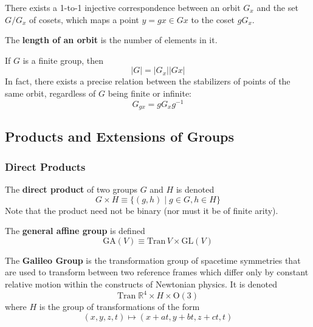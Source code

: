   \begin{theorem}
    There exists a 1-to-1 injective correspondence between an orbit $G_x$ and the set $G / G_{x}$ of cosets, which maps a point $y = g x \in G x $ to the coset $g G_x$. 
  \end{theorem}

  \begin{definition}
    The \textbf{length of an orbit} is the number of elements in it. 
  \end{definition}

  \begin{corollary}
    If $G$ is a finite group, then 
    \begin{equation}
      |G| = |G_x| |G x|
    \end{equation}
    In fact, there exists a precise relation between the stabilizers of points of the same orbit, regardless of $G$ being finite or infinite: 
    \begin{equation}
      G_{g x} = g G_{x} g^{-1}
    \end{equation}
  \end{corollary}

\subsection{Products and Extensions of Groups} 

\subsubsection{Direct Products}

  \begin{definition}
    The \textbf{direct product} of two groups $G$ and $H$ is denoted
    \begin{equation}
      G \times H \equiv \{ (g, h)\;|\; g \in G, h \in H \}
    \end{equation}
    Note that the product need not be binary (nor must it be of finite arity). 
  \end{definition}

  \begin{example}
    The \textbf{general affine group} is defined 
    \begin{equation}
      \text{GA}(V) \equiv \text{Tran}\,V \times \text{GL}(V)
    \end{equation}
  \end{example}

  \begin{example}
    The \textbf{Galileo Group} is the transformation group of spacetime symmetries that are used to transform between two reference frames which differ only by constant relative motion within the constructs of Newtonian physics. It is denoted 
    \begin{equation}
      \text{Tran}\;\mathbb{R}^{4} \times H \times \text{O} (3)
    \end{equation}
    where $H$ is the group of transformations of the form 
    \begin{equation}
      (x, y, z, t) \longmapsto (x+at, y+bt, z+ct, t)
    \end{equation}
  \end{example}

